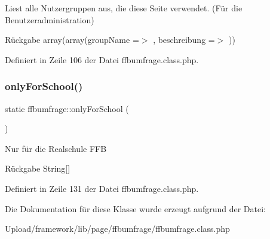 Liest alle Nutzergruppen aus, die diese Seite verwendet. (Für die Benutzeradministration) \begin{DoxyReturn}{Rückgabe}
array(array(\textquotesingle{}group\+Name\textquotesingle{} =$>$ \textquotesingle{}\textquotesingle{}, \textquotesingle{}beschreibung\textquotesingle{} =$>$ \textquotesingle{}\textquotesingle{})) 
\end{DoxyReturn}


Definiert in Zeile 106 der Datei ffbumfrage.\+class.\+php.

\mbox{\label{classffbumfrage_a8949df54c849cac6e2cf3cd5504d7675}} 
\subsubsection{\texorpdfstring{only\+For\+School()}{onlyForSchool()}}
{\footnotesize\ttfamily static ffbumfrage\+::only\+For\+School (\begin{DoxyParamCaption}{ }\end{DoxyParamCaption})\hspace{0.3cm}{\ttfamily [static]}}

Nur für die Realschule F\+FB \begin{DoxyReturn}{Rückgabe}
String\mbox{[}\mbox{]} 
\end{DoxyReturn}


Definiert in Zeile 131 der Datei ffbumfrage.\+class.\+php.



Die Dokumentation für diese Klasse wurde erzeugt aufgrund der Datei\+:\begin{DoxyCompactItemize}
\item 
Upload/framework/lib/page/ffbumfrage/ffbumfrage.\+class.\+php\end{DoxyCompactItemize}
